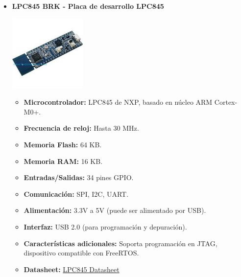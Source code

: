 \begin{itemize}
    \item \textbf{LPC845 BRK - Placa de desarrollo LPC845} 
    \begin{center}
        \includegraphics[width=0.3\textwidth]{Imagenes/LPC845.png}
    \end{center}
    \begin{itemize}
        \item \textbf{Microcontrolador:} LPC845 de NXP, basado en núcleo ARM Cortex-M0+.
        \item \textbf{Frecuencia de reloj:} Hasta 30 MHz.
        \item \textbf{Memoria Flash:} 64 KB.
        \item \textbf{Memoria RAM:} 16 KB.
        \item \textbf{Entradas/Salidas:} 34 pines GPIO.
        \item \textbf{Comunicación:} SPI, I2C, UART.
        \item \textbf{Alimentación:} 3.3V a 5V (puede ser alimentado por USB).
        \item \textbf{Interfaz:} USB 2.0 (para programación y depuración).
        \item \textbf{Características adicionales:} Soporta programación en JTAG, dispositivo compatible con FreeRTOS.
        \item \textbf{Datasheet:} 
        \href{https://www.nxp.com/products/processors-and-microcontrollers/arm-microcontrollers/general-purpose-mcus/lpc800-arm-cortex-m0-plus-/lpc845-breakout-board-for-lpc84x-family-mcus:LPC845-BRK}{LPC845 Datasheet}
    \end{itemize}


\end{itemize}
